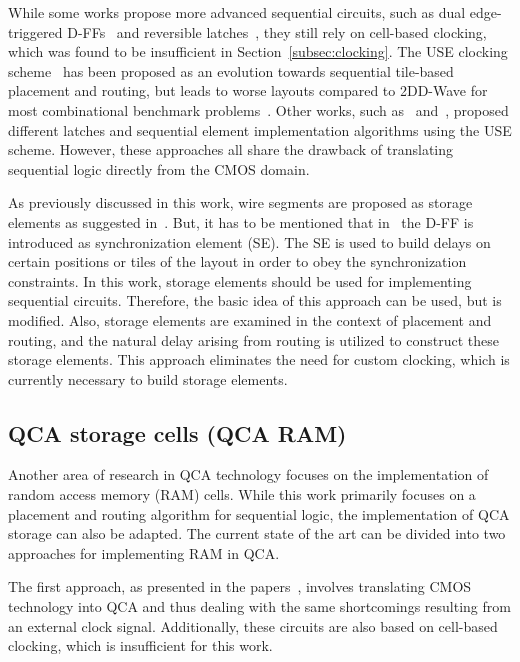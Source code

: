 While some works propose more advanced sequential circuits, such as dual edge-triggered D-FFs~\cite{dual_edge_triggered_FF_cell} and reversible latches~\cite{sequential_reversible_cell}, they still rely on cell-based clocking, which was found to be insufficient in Section~\ref{subsec:clocking}. The USE clocking scheme~\cite{USE} has been proposed as an evolution towards sequential tile-based placement and routing, but leads to worse layouts compared to 2DD-Wave for most combinational benchmark problems~\cite{walter2018exact}. Other works, such as~\cite{sequential_reversible_tile} and~\cite{sequential_tile_CMOS_alg}, proposed different latches and sequential element implementation algorithms using the USE scheme. However, these approaches all share the drawback of translating sequential logic directly from the CMOS domain.

As previously discussed in this work, wire segments are proposed as storage elements as suggested in~\cite{torres2018synchronization}. But, it has to be mentioned that in~\cite{torres2018synchronization} the D-FF is introduced as synchronization element (SE). The SE is used to build delays on certain positions or tiles of the layout in order to obey the synchronization constraints. In this work, storage elements should be used for implementing sequential circuits. Therefore, the basic idea of this approach can be used, but is modified. Also, storage elements are examined in the context of placement and routing, and the natural delay arising from routing is utilized to construct these storage elements. This approach eliminates the need for custom clocking, which is currently necessary to build storage elements.


\subsection{QCA storage cells (QCA RAM)}\label{subsec:RAM_SoA}
Another area of research in QCA technology focuses on the implementation of random access memory (RAM) cells. While this work primarily focuses on a placement and routing algorithm for sequential logic, the implementation of QCA storage can also be adapted. The current state of the art can be divided into two approaches for implementing RAM in QCA.

The first approach, as presented in the papers~\cite{RAM_overview, crosstalk, RAM_cell}, involves translating CMOS technology into QCA and thus dealing with the same shortcomings resulting from an external clock signal. Additionally, these circuits are also based on cell-based clocking, which is insufficient for this work.

